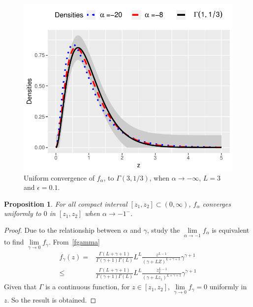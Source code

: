 \documentclass[technote,onecolumn,draftcls,12pt]{IEEEtran}
\newtheorem{proposition}{Proposition}
\numberwithin{equation}{section}
\newenvironment{dem}[1][Proof]{\begin{proof}[{\it #1}]}{\end{proof}}
\newcommand{\pa}[1]{\ensuremath{\left( #1 \right)}}
\begin{document}
\begin{figure}[hbt]
	\centering    
	\includegraphics[width=\linewidth]{../../../Figures/DTTeorico/ConvUniformeMenosInfinito2.pdf}
	\caption{\label{ConvInfinito}Uniform convergence of $f_{\alpha}$, to $\Gamma(3,1/3)$, when $\alpha \to -\infty$, $L=3$ and $\epsilon=0.1$.}
\end{figure} 

\begin{proposition}
	For all compact interval $[z_{1},z_{2}]\subset\pa{0,\infty}$, $f_{\alpha}$ converges uniformly to $0$ in $[z_{1},z_{2}]$ when $\alpha\to -1^{-}$.
	\label{pr: convergenciauniforme2}
\end{proposition}
\begin{dem} 
	Due to the relationship between $\alpha$ and $\gamma$, study the $\lim\limits_{\alpha\to-1} f_{\alpha}$ is equivalent to find
	$\lim\limits_{\gamma\to0} f_{\gamma}.$
	From~\ref{fgamma}
	\begin{align*}
	 f_{\gamma}\pa{z} = &\frac{\Gamma\pa{L+\gamma+1}}{\Gamma\pa{\gamma+1}\Gamma\pa{L}}
	L^{L} \frac{z^{L-1}}{(\gamma+LZ)^{L+\gamma+1}} \gamma^{\gamma +1}  \\
	\leq& \frac{\Gamma\pa{L+\gamma+1}}{\Gamma\pa{\gamma+1}\Gamma\pa{L}}
	L^{L} \frac{z_2^{L-1}}{(\gamma+Lz_1)^{L+\gamma+1}} \gamma^{\gamma +1} 
	\end{align*}
	Given that $\Gamma$ is a continuous function, for $z \in [z_{1},z_{2}]$, $\lim\limits_{\gamma\to0} f_{\gamma}=0$ uniformly in $z$. So the result is obtained.
\end{dem}
\end{document}
